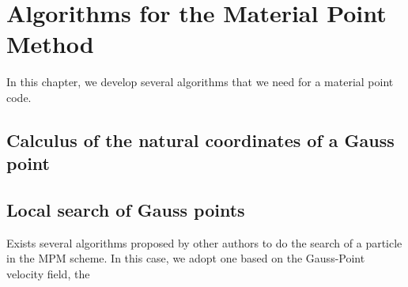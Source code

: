 
\section{Algorithms for the Material Point Method}
\label{sec:algor-mater-point}

In this chapter, we develop several algorithms that we need for a
material point code.

\subsection{Calculus of the natural coordinates of a Gauss point}
\label{sec:calc-natur-coord}


\subsection{Local search of Gauss points}
\label{sec:local-search-gauss}

Exists several algorithms proposed by other authors to do the search
of a particle in the MPM scheme. In this case, we adopt one based on
the Gauss-Point velocity field, the

